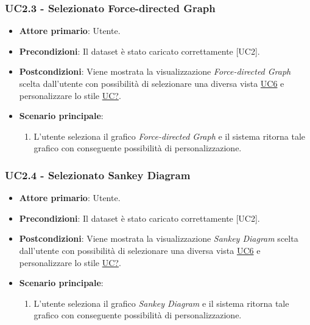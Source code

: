 \subsubsection{UC2.3 - Selezionato Force-directed Graph}
\label{sec:UC2.3}
\begin{itemize}
    \item \textbf{Attore primario}: Utente.
    \item \textbf{Precondizioni}: Il dataset è stato caricato correttamente [UC2].
    \item \textbf{Postcondizioni}: Viene mostrata la visualizzazione \textit{Force-directed Graph} scelta dall'utente con possibilità di selezionare una diversa vista \hyperref[sec:UC6]{UC6} e personalizzare lo stile \hyperref[sec:UC2]{UC?}. %
    \item \textbf{Scenario principale}:
          \begin{enumerate}
              \item L'utente seleziona il grafico \textit{Force-directed Graph} e il sistema ritorna tale grafico con conseguente possibilità di personalizzazione. 
          \end{enumerate}
\end{itemize}

\subsubsection{UC2.4 - Selezionato Sankey Diagram}
\label{sec:UC2.4}
\begin{itemize}
    \item \textbf{Attore primario}: Utente.
    \item \textbf{Precondizioni}: Il dataset è stato caricato correttamente [UC2].
    \item \textbf{Postcondizioni}: Viene mostrata la visualizzazione \textit{Sankey Diagram} scelta dall'utente con possibilità di selezionare una diversa vista \hyperref[sec:UC6]{UC6} e personalizzare lo stile \hyperref[sec:UC2]{UC?}. %
    \item \textbf{Scenario principale}:
          \begin{enumerate}
              \item L'utente seleziona il grafico \textit{Sankey Diagram} e il sistema ritorna tale grafico con conseguente possibilità di personalizzazione. 
          \end{enumerate}
\end{itemize}
\newpage

